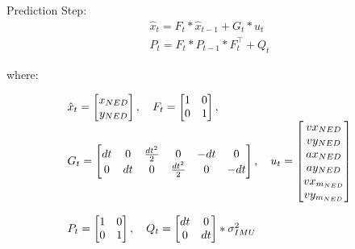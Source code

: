 \documentclass[conference]{IEEEtran}
\begin{document}
\vspace{5mm}
Prediction Step:
\begin{equation} 
 \begin{array}{l}
    \hat{x}_{t} = F_{t} * \hat{x}_{t-1} + G_{t} *u_{t} \\ 
    P_{t} = F_{t}* P_{t-1} * F_{t}^\top + Q_{t}
  \end{array}
\end{equation}

where:

\begin{equation}
\begin{array}{l}


 \hat{x}_{t} = \begin{bmatrix} 
                x_{NED} \\ 
                y_{NED}
                \end{bmatrix} ,  \quad
F_{t} = \begin{bmatrix} 
                1 & 0 \\ 
                0 & 1
                \end{bmatrix}      , \\
G_{t} =   \begin{bmatrix} 
                dt & 0 & \frac{dt^{2}}{2} & 0 & -dt & 0\\ 
                0 & dt & 0 & \frac{dt^{2}}{2} &0 & -dt
                \end{bmatrix} , \quad
u_{t} = \begin{bmatrix} 
                vx_{NED} \\ 
                vy_{NED} \\
                ax_{NED} \\
                ay_{NED} \\
                vx_{m_{NED}}\\
                vy_{m_{NED}}
                \end{bmatrix}  \\ \\
                
P_{t} =  \begin{bmatrix} 
                1 & 0 \\ 
                0 & 1
                \end{bmatrix}   , \quad 
Q_{t}  =\begin{bmatrix} 
                dt & 0 \\ 
                0 & dt
                \end{bmatrix} *\sigma^{2}_{IMU} 
\end{array} \\
\end{equation}
\end{document}
